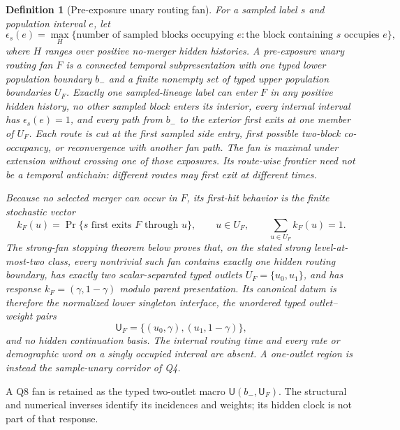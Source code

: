 \documentclass[11pt]{article}
\newtheorem{definition}[theorem]{Definition}
\begin{document}
\begin{definition}[Pre-exposure unary routing fan]
\label{def:unary-fan}
For a sampled label $s$ and population interval $e$, let
\[
 \epsilon_s(e)=\max_H\{\text{number of sampled blocks occupying }e:
             \text{the block containing }s\text{ occupies }e\},
\]
where $H$ ranges over positive no-merger hidden histories.  A
pre-exposure unary routing fan $F$ is a connected temporal subpresentation
with one typed lower population boundary $b_-$ and a finite nonempty set of
typed upper population boundaries $U_F$.  Exactly one sampled-lineage label can
enter $F$ in any positive hidden history, no other sampled block enters its
interior, every internal interval has $\epsilon_s(e)=1$, and every path from
$b_-$ to the exterior first exits at one member of $U_F$.  Each route is cut
at the first sampled side entry, first
possible two-block co-occupancy, or reconvergence with another fan path.  The
fan is maximal under extension without crossing one of those exposures.  Its
route-wise frontier need not be a temporal antichain: different routes may
first exit at different times.

Because no selected merger can occur in $F$, its first-hit behavior is the
finite stochastic vector
\[
 k_F(u)=\Pr\{s\text{ first exits }F\text{ through }u\},
 \qquad u\in U_F,\qquad \sum_{u\in U_F}k_F(u)=1.
\]
The strong-fan stopping theorem below proves that, on the stated strong
level-at-most-two class, every nontrivial such fan contains exactly one hidden
routing boundary, has exactly two scalar-separated typed outlets
$U_F=\{u_0,u_1\}$, and has response
$k_F=(\gamma,1-\gamma)$ modulo parent presentation.  Its canonical datum is
therefore the normalized lower singleton interface, the unordered typed
outlet--weight pairs
\[
 \mathsf U_F=\{(u_0,\gamma),(u_1,1-\gamma)\},
\]
and no hidden continuation basis.  The internal routing time and every rate or
demographic word on a singly occupied interval are absent.  A one-outlet
region is instead the sample-unary corridor of Q4.
\end{definition}

A Q8 fan is retained as the typed two-outlet macro
$\mathsf U(b_-,\mathsf U_F)$.  The structural and numerical inverses identify
its incidences and weights; its hidden clock is not part of that response.
\end{document}
